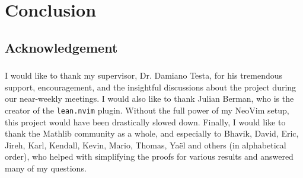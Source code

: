 
\section{Conclusion}

\subsection{Acknowledgement}
\begin{frame}\frametitle{\insertsubsection}

I would like to thank my supervisor, Dr. Damiano Testa, for his tremendous support, encouragement, and the insightful discussions about the project during our near-weekly meetings. I would also like to thank Julian Berman, who is the creator of the \texttt{lean.nvim} plugin. Without the full power of my NeoVim setup, this project would have been drastically slowed down. Finally, I would like to thank the Mathlib community as a whole, and especially to Bhavik, David, Eric, Jireh, Karl, Kendall, Kevin, Mario, Thomas, Yaël and others (in alphabetical order), who helped with simplifying the proofs for various results and answered many of my questions.

\end{frame}
